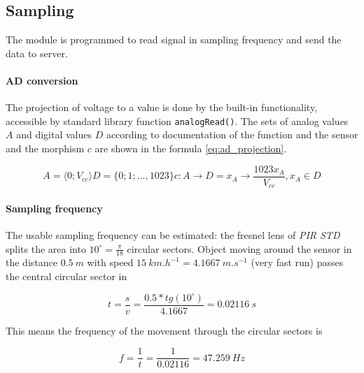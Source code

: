 \subsection*{Sampling}
The module is programmed to read signal in sampling frequency and send the data to server.

\paragraph{AD conversion}
The projection of voltage to a value is done by the built-in functionality, accessible by
standard library function \texttt{analogRead()}. The sets of analog values $A$ and digital values $D$
according to documentation of the function\cite{ArduinoAnalogRead} and the sensor\cite{PIROperationalManual}
and the morphism $c$ are shown in the formula \ref{eq:ad_projection}.

\begin{subequations}
\begin{equation}
A = \langle 0;V_{cc}\rangle
\end{equation}
\begin{equation}
D = \{0; 1; ..., 1023\}
\end{equation}
\begin{equation}
c: A \rightarrow D = x_A \rightarrow \frac{1023x_A}{V_{cc}}, x_A \in D
\end{equation}
\label{eq:ad_projection}
\end{subequations}

\paragraph{Sampling frequency}
The usable sampling frequency can be estimated: the fresnel lens of {\it PIR STD} splits the
area into $10^{\circ} = \frac{\pi}{18}$ circular sectors. Object moving around the sensor in the distance $0.5~m$
with speed $15~km.h^{-1} = 4.1667~m.s^{-1}$ (very fast run) passes the central circular sector in

\begin{equation}
t = \frac{s}{v} = \frac{0.5*tg(10^{\circ})}{4.1667} = 0.02116~s
\end{equation}

This means the frequency of the movement through the circular sectors is

\begin{equation}
f = \frac{1}{t} = \frac{1}{0.02116} = 47.259~Hz
\end{equation}

